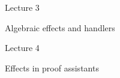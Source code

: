 \documentclass[10pt]{beamer}
\begin{document}


\begin{frame}
  \begin{center}
    \Huge Lecture 3

    \bigskip

    \Large
    Algebraic effects and handlers
  \end{center}
\end{frame}



\begin{frame}
  \begin{center}
    \Huge Lecture 4

    \bigskip

    \Large
    Effects in proof assistants
  \end{center}
\end{frame}

\end{document}
